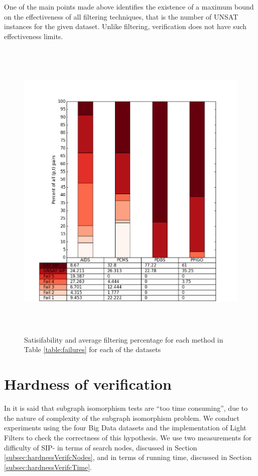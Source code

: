 \documentclass{l4proj}
\begin{document}
One of the main points made above identifies the existence of a maximum bound on the effectiveness of all filtering techniques, that is the number of UNSAT instances for the given dataset. Unlike filtering, verification does not have such effectiveness limits.
\begin{figure}
\centering
\includegraphics[height=15cm,width=13.5cm]{images/plots/splittedSIP.png}
\caption{Satisifability and average filtering percentage for each method in Table \ref{table:failures} for each of the datasets}
\label{averageFailures}
\end{figure}

\section{Hardness of verification}
\label{sec:sip1verificationeval}
In \cite{foteini} it is said that subgraph isomorphism tests are ``too time consuming'', due to the nature of complexity of the subgraph isomorphism problem. We conduct experiments using the four Big Data datasets and the implementation of Light Filters to check the correctness of this hypothesis. We use two measurements for difficulty of SIP- in terms of search nodes, discussed in Section \ref{subsec:hardnessVerifcNodes}, and in terms of running time, discussed in Section \ref{subsec:hardnessVerifcTime}. 
\end{document}
